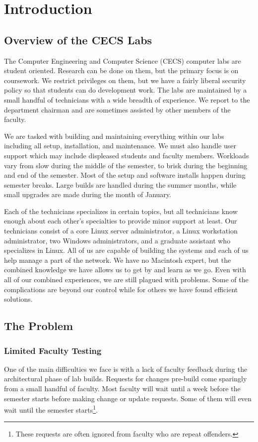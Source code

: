 \chapter{Introduction} \label{ch:introduction}
\section{Overview of the CECS Labs}

The Computer Engineering and Computer Science (CECS) computer labs are student oriented.  Research can be done on them, but the primary focus is on coursework.  We restrict privileges on them, but we have a fairly liberal security policy so that students can do development work.  The labs are maintained by a small handful of technicians with a wide breadth of experience.  We report to the department chairman and are sometimes assisted by other members of the faculty. 

We are tasked with building and maintaining everything within our labs including all setup, installation, and maintenance.  We must also handle user support which may include displeased students and faculty members.  Workloads vary from slow during the middle of the semester, to brisk during the beginning and end of the semester.  Most of the setup and software installs happen during semester breaks.  Large builds are handled during the summer months, while small upgrades are made during the month of January. 

Each of the technicians specializes in certain topics, but all technicians know enough about each other’s specialties to provide minor support at least.  Our technicians consist of a core Linux server administrator, a Linux workstation administrator, two Windows administrators, and a graduate assistant who specializes in Linux.  All of us are capable of building the systems and each of us help manage a part of the network.  We have no Macintosh expert, but the combined knowledge we have allows us to get by and learn as we go.  Even with all of our combined experiences, we are still plagued with problems.  Some of the complications are beyond our control while for others we have found efficient solutions.

\section{The Problem} \label{sec:the_problem}
\subsection{Limited Faculty Testing}
One of the main difficulties we face is with a lack of faculty feedback during the architectural phase of lab builds.  Requests for changes pre-build come sparingly from a small handful of faculty.  Most faculty will wait until a week before the semester starts before making change or update requests.  Some of them will even wait until the semester starts\footnote{These requests are often ignored from faculty who are repeat offenders.}. 

